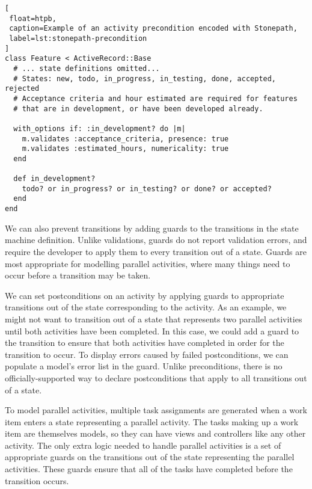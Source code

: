 \begin{lstlisting}[
 float=htpb,
 caption=Example of an activity precondition encoded with Stonepath,
 label=lst:stonepath-precondition
]
class Feature < ActiveRecord::Base
  # ... state definitions omitted...
  # States: new, todo, in_progress, in_testing, done, accepted, rejected
  # Acceptance criteria and hour estimated are required for features
  # that are in development, or have been developed already.

  with_options if: :in_development? do |m|
    m.validates :acceptance_criteria, presence: true
    m.validates :estimated_hours, numericality: true
  end

  def in_development?
    todo? or in_progress? or in_testing? or done? or accepted?
  end
end
\end{lstlisting}

We can also prevent transitions by adding guards to the transitions in the state machine definition. Unlike validations, guards do not report validation errors, and require the developer to apply them to every transition out of a state. Guards are most appropriate for modelling parallel activities, where many things need to occur before a transition may be taken.


We can set postconditions on an activity by applying guards to appropriate transitions out of the state corresponding to the activity. As an example, we might not want to transition out of a state that represents two parallel activities until both activities have been completed. In this case, we could add a guard to the transition to ensure that both activities have completed in order for the transition to occur. To display errors caused by failed postconditions, we can populate a model’s error list in the guard. Unlike preconditions, there is no officially-supported way to declare postconditions that apply to all transitions out of a state.


To model parallel activities, multiple task assignments are generated when a work item enters a state representing a parallel activity. The tasks making up a work item are themselves models, so they can have views and controllers like any other activity. The only extra logic needed to handle parallel activities is a set of appropriate guards on the transitions out of the state representing the parallel activities. These guards ensure that all of the tasks have completed before the transition occurs.

